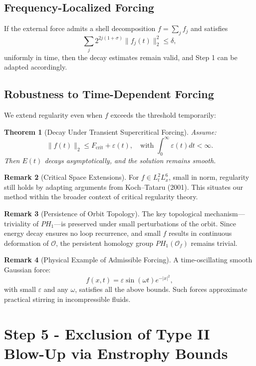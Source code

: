 \documentclass[11pt]{article}
\newtheorem{theorem}{Theorem}[section]
\theoremstyle{definition}
\newtheorem{remark}[theorem]{Remark}
\begin{document}
\subsection*{Frequency-Localized Forcing}
If the external force admits a shell decomposition $f = \sum_j f_j$ and satisfies
\[
\sum_j 2^{2j(1+\sigma)} \|f_j(t)\|_2^2 \le \delta,
\]
uniformly in time, then the decay estimates remain valid, and Step 1 can be adapted accordingly.

\subsection*{Robustness to Time-Dependent Forcing}
We extend regularity even when $f$ exceeds the threshold temporarily:

\begin{theorem}[Decay Under Transient Supercritical Forcing]
Assume:
\[
\|f(t)\|_2 \le F_{\mathrm{crit}} + \varepsilon(t), \quad \text{with } \int_0^\infty \varepsilon(t) dt < \infty.
\]
Then $E(t)$ decays asymptotically, and the solution remains smooth.
\end{theorem}

\begin{remark}[Critical Space Extensions]
For $f \in L^2_t L^6_x$, small in norm, regularity still holds by adapting arguments from Koch–Tataru (2001). This situates our method within the broader context of critical regularity theory.
\end{remark}

\begin{remark}[Persistence of Orbit Topology]
The key topological mechanism—triviality of $PH_1$—is preserved under small perturbations of the orbit. Since energy decay ensures no loop recurrence, and small $f$ results in continuous deformation of $\mathcal{O}$, the persistent homology group $PH_1(\mathcal{O}_f)$ remains trivial.
\end{remark}

\begin{remark}[Physical Example of Admissible Forcing]
A time-oscillating smooth Gaussian force:
\[
f(x,t) = \varepsilon \sin(\omega t) e^{-|x|^2},
\]
with small $\varepsilon$ and any $\omega$, satisfies all the above bounds. Such forces approximate practical stirring in incompressible fluids.
\end{remark}


\section{Step 5 - Exclusion of Type II Blow-Up via Enstrophy Bounds}
\label{sec:step5}
\end{document}

